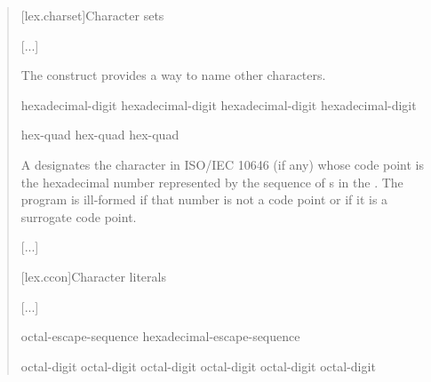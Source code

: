 \documentclass{wg21}
\begin{document}
    \begin{quote}
        
        [lex.charset]{Character sets}
        
        [...]    
        
        \pnum
        The  construct provides a way to name
        other characters.
        
        \begin{bnf}
            \br
            hexadecimal-digit hexadecimal-digit hexadecimal-digit hexadecimal-digit
        \end{bnf}
        
        \begin{bnf}
            \br
             hex-quad\br
             hex-quad hex-quad\br
        \end{bnf}
        
        
        A 
        designates the character in ISO/IEC 10646 (if any)
        whose code point is the hexadecimal number represented by
        the sequence of s
        in the .
        The program is ill-formed if that number is not a code point
        or if it is a surrogate code point.
        
        [...]
        
        [lex.ccon]{Character literals}
        
        [...]
        
        \begin{bnf}
            \br
            octal-escape-sequence\br
            hexadecimal-escape-sequence
        \end{bnf}
        
        \begin{bnf}
            \br
            \terminal{\textbackslash} octal-digit\br
            \terminal{\textbackslash} octal-digit octal-digit\br
            \terminal{\textbackslash} octal-digit octal-digit octal-digit\br
        \end{bnf}
        

\end{quote}
\end{document}
